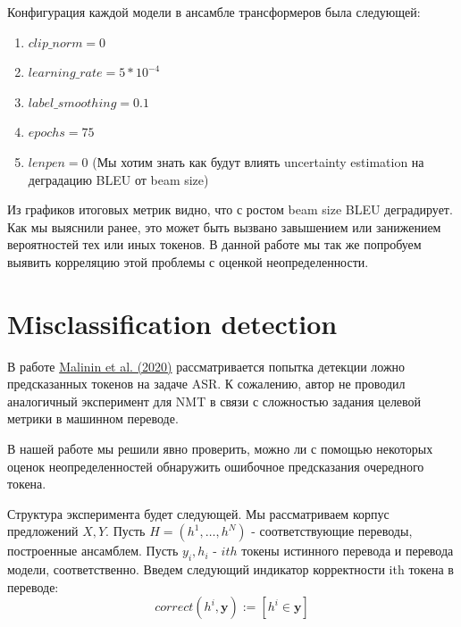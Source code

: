 \documentclass[a4paper,14pt]{extarticle}
\newcommand{\bibref}[3]{\hyperlink{#1}{#2 (#3)}}
\begin{document}
	\begin{figure}[t]
	\end{figure}
	
	Конфигурация каждой модели в ансамбле трансформеров была следующей:
	\begin{enumerate}
		\item $clip\_norm = 0$
		\item $learning\_rate=5*10^{-4}$
		\item $label\_smoothing=0.1$
		\item $epochs=75$
		\item $lenpen=0$ (Мы хотим знать как будут влиять uncertainty estimation на деградацию BLEU от  beam size)
	\end{enumerate}
	
	Из графиков итоговых метрик видно, что с ростом beam size BLEU деградирует. Как мы выяснили ранее, это может быть вызвано завышением или занижением вероятностей тех или иных токенов. В данной работе мы так же попробуем выявить корреляцию этой проблемы с оценкой неопределенности.
	
\section{Misclassification detection}
	В работе \bibref{uncertainty}{Malinin et al.}{2020} рассматривается попытка детекции ложно предсказанных токенов на задаче ASR. К сожалению, автор не проводил аналогичный эксперимент для NMT в связи с сложностью задания целевой метрики в машинном переводе.
	
	В нашей работе мы решили явно проверить, можно ли с помощью некоторых оценок неопределенностей обнаружить ошибочное предсказания очередного токена.
	
	Структура эксперимента будет следующей. Мы рассматриваем корпус предложений $X, Y$. Пусть $H = (h^1, \dots, h^N)$ - соответствующие переводы, построенные ансамблем. Пусть $y_{i}, h_{i}$ - $ith$ токены истинного перевода и перевода модели, соответственно. Введем следующий индикатор корректности ith токена в переводе:
	\begin{equation}
		correct(h^{i}, \textbf{y}) := [h^{i} \in \textbf{y}]
	\end{equation}
	
\end{document}
